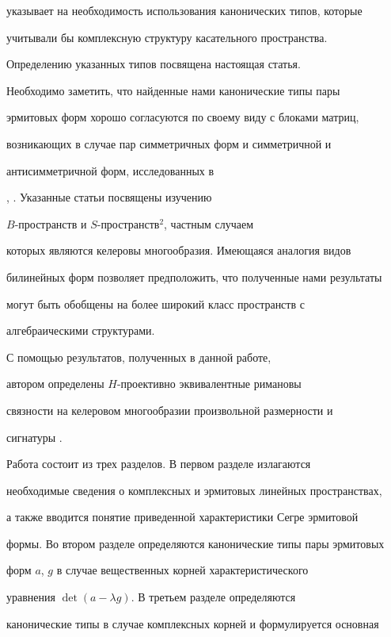 указывает на необходимость использования канонических типов, которые


учитывали бы комплексную структуру касательного пространства.


Определению указанных типов посвящена настоящая статья.





Необходимо заметить, что найденные нами канонические типы пары


эрмитовых форм хорошо согласуются по своему виду с блоками матриц,


возникающих в случае пар симметричных форм и симметричной и


антисимметричной форм, исследованных в


\cite{vish1}, \cite{vish2}. Указанные статьи посвящены изучению


$B$-пространств и $S$-пространств${}^2$, частным случаем


которых являются келеровы многообразия. Имеющаяся аналогия видов


билинейных форм позволяет предположить, что полученные нами результаты


могут быть обобщены на более широкий класс пространств с


алгебраическими структурами.





С помощью результатов, полученных в данной работе,


автором определены $H$-проективно эквивалентные римановы


связности на келеровом многообразии произвольной размерности и


сигнатуры \cite{tez}.





Работа состоит из трех разделов. В первом разделе излагаются


необходимые сведения о комплексных и эрмитовых линейных пространствах,


а также вводится понятие приведенной характеристики Сегре эрмитовой


формы. Во втором разделе определяются канонические типы пары эрмитовых


форм $a$, $g$ в случае вещественных корней характеристического


уравнения $\det (a-\lambda g)$. В третьем разделе определяются


канонические типы в случае комплексных корней и формулируется основная


